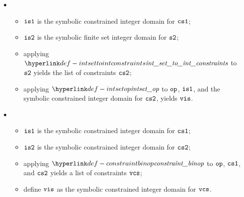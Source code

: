 \begin{itemize}
  \item {}
  \begin{itemize}
    \item $\visone$ is the symbolic constrained integer domain for $\csone$;
    \item $\vistwo$ is the symbolic finite set integer domain for $\vstwo$;
    \item applying $\intsettointconstraints$ to $\vstwo$ yields the list of constraints $\cstwo$;
    \item applying $\intsetop$ to $\op$, $\visone$, and the symbolic constrained integer domain
          for $\cstwo$, yields $\vis$.
  \end{itemize}

  \item {}
  \begin{itemize}
    \item $\visone$ is the symbolic constrained integer domain for $\csone$;
    \item $\vistwo$ is the symbolic constrained integer domain for $\cstwo$;
    \item applying $\constraintbinop$ to $\op$, $\csone$, and $\cstwo$ yields
          a list of constraints $\vcs$;
    \item define $\vis$ as the symbolic constrained integer domain for $\vcs$.
  \end{itemize}
\end{itemize}

\FormallyParagraph
{}

\begin{mathpar}
\end{mathpar}

\begin{mathpar}
\end{mathpar}

